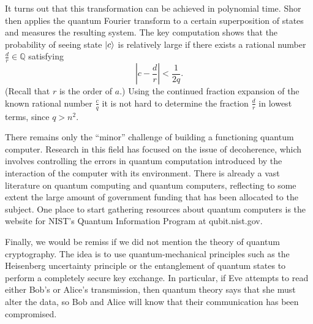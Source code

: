 \documentclass{article}
\newcommand{\Q}{\mathbb{Q}}
\begin{document}
It turns out that this transformation can be achieved in polynomial time. Shor then applies the quantum Fourier transform to a certain superposition of states and measures the resulting system. The key computation shows that the probability of seeing state \(\ket{c}\) is relatively large if there exists a rational number \(\frac{d}{r} \in \Q\) satisfying 
\[
    \left| c - \frac{d}{r} \right| < \frac{1}{2q}.
\]
(Recall that \(r\) is the order of \(a\).) Using the continued fraction expansion of the known rational number \(\frac{c}{q}\) it is not hard to determine the fraction \(\frac{d}{r}\) in lowest terms, since \(q > n^{2}\).

There remains only the “minor” challenge of building a functioning quantum  computer. Research in this field has focused on the issue of decoherence,  which involves controlling the errors in quantum computation introduced by  the interaction of the computer with its environment. There is already a vast  literature on quantum computing and quantum computers, reflecting to some  extent the large amount of government funding that has been allocated to the  subject. One place to start gathering resources about quantum computers is  the website for NIST's Quantum Information Program at qubit.nist.gov. 

Finally, we would be remiss if we did not mention the theory of quantum  cryptography. The idea is to use quantum-mechanical principles such as the  Heisenberg uncertainty principle or the entanglement of quantum states to  perform a completely secure key exchange. In particular, if Eve attempts to  read either Bob's or Alice's transmission, then quantum theory says that she  must alter the data, so Bob and Alice will know that their communication  has been compromised.   
\end{document}
